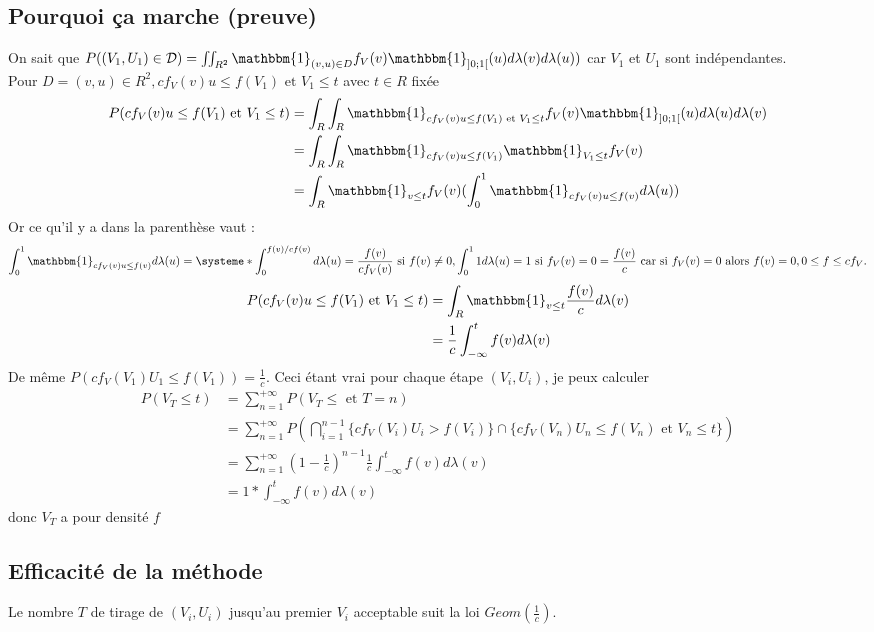 \documentclass{article}
\theoremstyle{plain}%
\theoremstyle{definition}
\theoremstyle{remark}
\begin{document}
\subsection{Pourquoi ça marche (preuve)}
On sait que $ P((V_1,U_1) \in \mathcal{D}) = \iint_{R^2}^{} \mathbbm{1}_{(v,u)\in D}f_V(v) \mathbbm{1}_{]0;1[}(u) d \lambda (v) d \lambda (u))$ car $ V_1 $ et $ U_1 $ sont indépendantes. \\
Pour $ D={(v,u) \in R^2, cf_V(v)u \leq f(V_1) \text{ et } V_1 \leq t} $ avec $ t \in R $ fixée 
\begin{align*}
	P(cf_V(v)u \leq f(V_1) \text{ et } V_1 \leq t) &= \int_{R}^{} \int_{R}^{} \mathbbm{1}_{cf_V(v)u \leq f(V_1) \text{ et } V_1 \leq t} f_V(v) \mathbbm{1}_{]0;1[}(u)d \lambda (u) d \lambda (v) \\
		&= \int_{R}^{} \int_{R}^{} \mathbbm{1}_{cf_V(v)u \leq f(V_1)} \mathbbm{1}_{ V_1 \leq t} f_V(v) \\
		&= \int_{R}^{}\mathbbm{1}_{v \leq t}f_V(v) (\int_{0}^{1}\mathbbm{1}_{cf_V(v)u \leq f(v)}d \lambda (u))
\end{align*}
Or ce qu'il y a dans la parenthèse vaut : 
\[
	\int_{0}^{1}\mathbbm{1}_{cf_V(v)u \leq f(v)}d \lambda (u) = \systeme*{
		\int_{0}^{f(v)/cf(v)} d \lambda (u) = \frac{f(v)}{cf_V(v)} \text{ si } f(v) \neq 0, 
		\int_{0}^{1}1 d \lambda (u) = 1 \text{ si } f_V(v)=0
	} = \frac{f(v)}{c} \text{ car si } f_V(v) = 0 \text{ alors } f(v) = 0, 0 \leq f \leq cf_V
.\]
\begin{align*}
	P(cf_V(v)u \leq f(V_1) \text{ et } V_1 \leq t) &= \int_{R}^{}\mathbbm{1}_{v \leq t}\frac{f(v)}{c} d \lambda (v) \\
	&= \frac{1}{c} \int_{-\infty }^{t}f(v) d \lambda (v)
\end{align*}
De même $ P(cf_V(V_1) U_1 \leq f(V_1)) = \frac{1}{c}$. Ceci étant vrai pour chaque étape $ (V_i, U_i) $, je peux calculer 
\begin{align*}
	P(V_T \leq t) &= \sum_{n=1}^{+\infty } P(V_T \leq \text{ et } T=n) \\
				&= \sum_{n=1}^{+\infty }P(\bigcap_{i=1}^{n-1}\{cf_V(V_i)U_i > f(V_i)\} \cap \{cf_V(V_n) U_n \leq f(V_n) \text{ et }V_n \leq t\}) \\
				&= \sum_{n=1}^{+\infty } (1- \frac{1}{c})^{n-1} \frac{1}{c} \int_{-\infty }^{t} f(v) d \lambda (v) \\
				&= 1 * \int_{-\infty }^{t} f(v) d \lambda (v) 
\end{align*}
donc $ V_T $ a pour densité $ f $ 

\subsection{Efficacité de la méthode}
Le nombre $ T $ de tirage de $ (V_i,U_i) $ jusqu'au premier $ V_i $ acceptable suit la loi $ Geom(\frac{1}{c}) $. 
\end{document}
